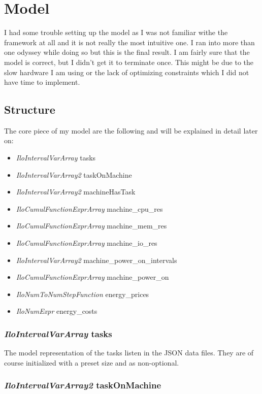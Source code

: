 \section{Model}

I had some trouble setting up the model as I was not familiar withe the framework at all and it is not really the most intuitive one. I ran into more than one odyssey while doing so but this is the final result. I am fairly sure that the model is correct, but I didn't get it to terminate once. This might be due to the slow hardware I am using 
or the lack of optimizing constraints which I did not have time to implement.

\subsection{Structure}

The core piece of my model are the following and will be explained in detail later on:

\begin{itemize}
	\item \textit{IloIntervalVarArray} tasks
	\item \textit{IloIntervalVarArray2} taskOnMachine
	\item \textit{IloIntervalVarArray2} machineHasTask
	\item \textit{IloCumulFunctionExprArray} machine\_cpu\_res
	\item \textit{IloCumulFunctionExprArray} machine\_mem\_res
	\item \textit{IloCumulFunctionExprArray} machine\_io\_res
	\item \textit{IloIntervalVarArray2} machine\_power\_on\_intervals
	\item \textit{IloCumulFunctionExprArray} machine\_power\_on
	\item \textit{IloNumToNumStepFunction} energy\_prices
	\item \textit{IloNumExpr} energy\_costs
\end{itemize}

\subsubsection{\textit{IloIntervalVarArray} tasks}

The model representation of the tasks listen in the JSON data files. They are of course initialized 
with a preset size and as non-optional.

\subsubsection{\textit{IloIntervalVarArray2} taskOnMachine}

